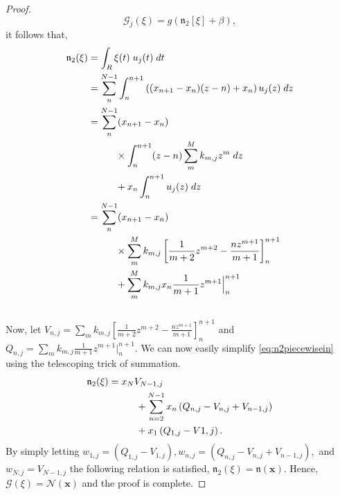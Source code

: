 \documentclass{article}
\begin{document}
\begin{proof}
  \begin{equation}  \label{eq:n2nrelation}
    \mathcal{G}_j(\xi) = g\left(\mathfrak{n}_2[\xi] + \beta\right),
  \end{equation}
  it follows that,
  \begin{equation} \label{eq:n2piecewisein}
  \begin{aligned}
    \mathfrak{n}_2(\xi) &= \int_R\xi(t)\;u_j(t)\;dt \\ 
     &= \sum_n^{N-1}\int_n^{n+1} \left((x_{n+1} - x_n)(z - n) + x_n\right) u_j(z)\;dz\\ 
      &= \sum_n^{N-1}(x_{n+1} - x_n) \\
      &\hspace*{1cm}\times \int_n^{n+1} (z - n) \sum_m^M k_{m,j} z^m\;dz\\
      &\hspace*{1cm} + x_n\int_n^{n+1} u_j(z)\;dz\\
        &= \sum_n^{N-1}(x_{n+1} - x_n)\\
        &\hspace*{1cm} \times \sum_m^M k_{m,j} \left[\frac{1}{m+2}z^{m+2} - \frac{nz^{m+1}}{m+1}\right]_n^{n+1}\\
        &\hspace*{1cm}  + \sum_m^M k_{m,j} x_n \frac1{m+1}z^{m+1}\Big|^{n+1}_n
      \end{aligned}
      \end{equation}
      \\
      Now, let $V_{n,j} = \sum_m k_{m,j} \left[\frac{1}{m+2}z^{m+2} - \frac{nz^{m+1}}{m+1}\right]_n^{n+1}$ and $Q_{n,j} = \sum_m k_{m,j} \frac1{m+1}z^{m+1}\big|^{n+1}_n.$ We can now easily simplify \eqref{eq:n2piecewisein} using the telescoping trick of summation.
      \begin{equation}
        \begin{aligned}
        \mathfrak{n}_2(\xi) &= x_NV_{N-1,j} \\
        &\hspace*{1cm}+ \sum_{n=2}^{N-1}x_n\left(Q_{n,j} - V_{n,j} + V_{n-1,j}\right)\\
        &\hspace*{1cm} + x_1\left(Q_{1,j} - V{1,j}\right).
        \end{aligned}
      \end{equation}
      By simply letting $w_{1,j} = \left(Q_{1,j} - V_{1,j}\right), w_{n,j} = \left(Q_{n,j} - V_{n,j} + V_{n-1,j}\right),$ and $w_{N,j} = V_{N-1,j}$
      the following relation is satisfied,
      $\mathfrak{n}_2(\xi) = \mathfrak{n}(\pmb{x}).$
      Hence, $\mathcal{G}(\xi) = \mathcal{N}(\pmb{x})$ and the proof is complete.
    \end{proof}
\end{document}
